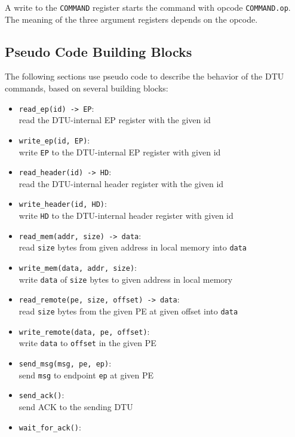 \documentclass[a4paper,11pt,draft]{article}
\begin{document}
\noindent A write to the \texttt{COMMAND} register starts the command with opcode
\texttt{COMMAND.op}. The meaning of the three argument registers depends on the opcode.

\subsection{Pseudo Code Building Blocks}

The following sections use pseudo code to describe the behavior of the DTU commands, based on
several building blocks:

\begin{itemize}
  \item \texttt{read\_ep(id) -> EP}:\\
  read the DTU-internal EP register with the given id
  \item \texttt{write\_ep(id, EP)}:\\
  write \texttt{EP} to the DTU-internal EP register with given id
  \item \texttt{read\_header(id) -> HD}:\\
  read the DTU-internal header register with the given id
  \item \texttt{write\_header(id, HD)}:\\
  write \texttt{HD} to the DTU-internal header register with given id
  \item \texttt{read\_mem(addr, size) -> data}:\\
  read \texttt{size} bytes from given address in local memory into \texttt{data}
  \item \texttt{write\_mem(data, addr, size)}:\\
  write \texttt{data} of \texttt{size} bytes to given address in local memory
  \item \texttt{read\_remote(pe, size, offset) -> data}:\\
  read \texttt{size} bytes from the given PE at given offset into \texttt{data}
  \item \texttt{write\_remote(data, pe, offset)}:\\
  write \texttt{data} to \texttt{offset} in the given PE
  \item \texttt{send\_msg(msg, pe, ep)}:\\
  send \texttt{msg} to endpoint \texttt{ep} at given PE
  \item \texttt{send\_ack()}:\\
  send ACK to the sending DTU
  \item \texttt{wait\_for\_ack()}:\\

\end{itemize}
\end{document}
